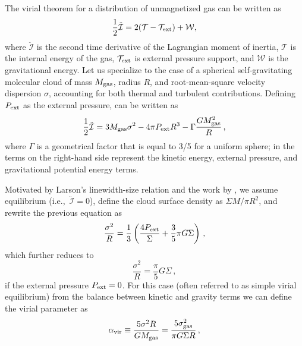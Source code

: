 \IfFileExists{emulateapjlegacy.cls}{\documentclass[iop]{emulateapjlegacy}}{\documentclass[iop]{emulateapj}}
\begin{document}
The virial theorem for a distribution of unmagnetized gas can be written as \citep{McKee92a}
\begin{equation}\label{eqn:virial_th_general}
\frac{1}{2}\ddot{\mathcal{I}} = 2(\mathcal{T} - \mathcal{T}_{\rm ext}) + \mathcal{W},
\end{equation}
where $\ddot{\mathcal{I}}$ is the second time derivative of the Lagrangian moment of inertia, $\mathcal{T}$ is the internal energy of the gas, $\mathcal{T}_{\rm ext}$ is external pressure support, and $\mathcal{W}$ is the gravitational energy.
%
Let us specialize to the case of a spherical self-gravitating molecular cloud of mass $M_{\rm gas}$, radius $R$, and root-mean-square velocity dispersion $\sigma$, accounting for both thermal and turbulent contributions.
Defining $P_{\rm ext}$ as the external pressure,  can be written as
\begin{equation}
\frac{1}{2}{\ddot{\mathcal{I}}} = 3 M_{\rm gas} \sigma^2 - 4\pi P_{\rm ext} R^3 - \Gamma\frac{GM_{\rm gas}^2}{R}\,,
\label{eqn:virial}
\end{equation}
where $\Gamma$ is a geometrical factor that is equal to 3/5 for a uniform sphere; in  the terms on the right-hand side represent the
    kinetic energy, external pressure, and gravitational potential energy terms.

Motivated by Larson's linewidth-size relation \citep{Larson81a} and the work by \citet{Heyer09a}, we assume equilibrium (i.e.,\ ${\ddot{\mathcal{I}}}=0$), define the cloud surface density as
$\Sigma$\eq$M/\pi R^2$, and rewrite the previous equation as
\begin{equation}
\frac{\sigma^2}{R} = \frac{1}{3}\left(\frac{4P_{\rm ext}}{\Sigma} + \frac{3}{5} \pi G \Sigma \right)\,,
\label{eqn:v0}
\end{equation}
which further reduces to
\begin{equation}
\frac{\sigma^2}{R} = \frac{\pi}{5} G \Sigma\,,
\label{eqn:SVE}
\end{equation}
if the external pressure $P_{\rm ext}=0$. For this case (often referred to as simple virial equilibrium) from the balance between kinetic and gravity terms we can define the virial parameter as
\begin{equation}
\alpha_{\rm vir} \equiv  \frac{5\sigma^2R}{GM_{\rm gas}} = \frac{5\sigma_{\rm gas}^2}{\pi G \Sigma R}\,,
\label{eqn:alpha}
\end{equation}
\end{document}
